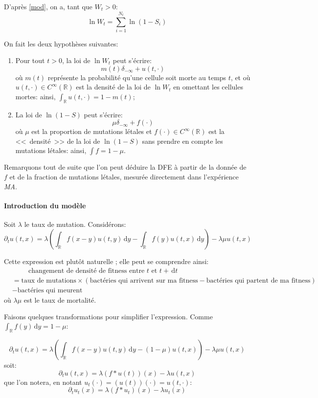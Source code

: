 \documentclass[12pt]{article}
\newcounter{prop}[section]
\newcommand{\pth}[1]{\left(#1\right)}
\newcommand{\esp}{\hspace{1cm}}
\newcommand{\Er}{\mathbb{R}}
\newcommand{\de}{\,\mathrm{d}}
\newcommand{\dr}{\partial}
\begin{document}
D'après \eqref{mod}, on a, tant que $W_t>0$: \[\ln W_t=\sum_{i=1}^{N_t}\ln(1-S_i)\]

On fait les deux hypothèses suivantes:
\begin{enumerate}
\item Pour tout $t>0$, la loi de $\ln W_t$ peut s'écrire:
  \[m(t)\delta_{-\infty}+u(t,\cdot)\]
  où $m(t)$ représente la probabilité qu'une cellule soit morte au temps $t$, et où $u(t,\cdot)\in C^{\infty}(\Er)$ est la densité de la loi de $\ln W_t$ en omettant les cellules mortes: ainsi, $\int_{\Er}u(t,\cdot)=1-m(t)$;
\item La loi de $\ln (1-S)$ peut s'écrire:
  \[\mu\delta_{-\infty}+f(\cdot)\]
  où $\mu$ est la proportion de mutations létales et $f(\cdot)
  \in C^{\infty}(\Er)$ est la <<~densité~>> de la loi de $\ln(1-S)$ sans prendre en compte les mutations létales: ainsi, $\int f=1-\mu$.
\end{enumerate}

Remarquons tout de suite que l'on peut déduire la DFE à partir de la donnée de $f$ et de la fraction de mutations létales, mesurée directement dans l'expérience \emph{MA}.

\paragraph{Introduction du modèle}

Soit $\lambda$ le taux de mutation. Considérons:
\[\dr_tu(t,x)=\lambda\pth{\int_{\Er}f(x-y)u(t,y)\de y-\int_{\Er}f(y)u(t,x)\de y}-\lambda\mu u(t,x)\]

Cette expression est plutôt naturelle ; elle peut se comprendre ainsi:
\begin{align*}
&\esp\text{changement de densité de fitness entre $t$ et $t+\de t$}\\
&=\text{taux de mutations}\times\pth{\text{bactéries qui arrivent sur ma fitness}-\text{bactéries qui partent de ma fitness}}\\
&-\text{bactéries qui meurent}
\end{align*} 
où $\lambda\mu$ est le taux de mortalité. 

Faisons quelques transformations pour simplifier l'expression. Comme $\int_{\Er}f(y)\de y = 1-\mu$:

\[\dr_tu(t,x)=\lambda\pth{\int_{\Er}f(x-y)u(t,y)\de y-(1-\mu)u(t,x)}-\lambda\mu u(t,x)\] 
soit:
\[\dr_tu(t,x)=\lambda (f*u(t))(x)-\lambda u(t,x)\] 
que l'on notera, en notant $u_t(\cdot)=(u(t))(\cdot)=u(t,\cdot)$:
\begin{equation}\label{edp}
  \dr_tu_t(x)=\lambda (f*u_t)(x)-\lambda u_t(x)
\end{equation}
\end{document}
